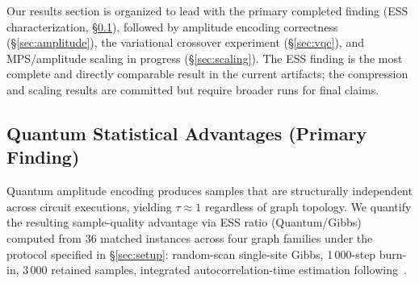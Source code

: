     
    
    Our results section is organized to lead with the primary completed
    finding (ESS characterization, \S\ref{sec:ess}), followed by amplitude
    encoding correctness (\S\ref{sec:amplitude}), the variational crossover
    experiment (\S\ref{sec:vqc}), and MPS/amplitude scaling in progress
    (\S\ref{sec:scaling}). The ESS finding is the most complete and directly
    comparable result in the current artifacts; the compression and scaling
    results are committed but require broader runs for final claims.
    
    
    
    \subsection{Quantum Statistical Advantages (Primary Finding)}
    \label{sec:ess}
    
    Quantum amplitude encoding produces samples that are structurally
    independent across circuit executions, yielding $\tau \approx 1$
    regardless of graph topology. We quantify the resulting sample-quality
    advantage via ESS ratio (Quantum/Gibbs) computed from 36 matched
    instances across four graph families under the protocol specified in
    \S\ref{sec:setup}: random-scan single-site Gibbs, 1\,000-step burn-in,
    3\,000 retained samples, integrated autocorrelation-time estimation
    following~\cite{geyer1992practical}.
    
